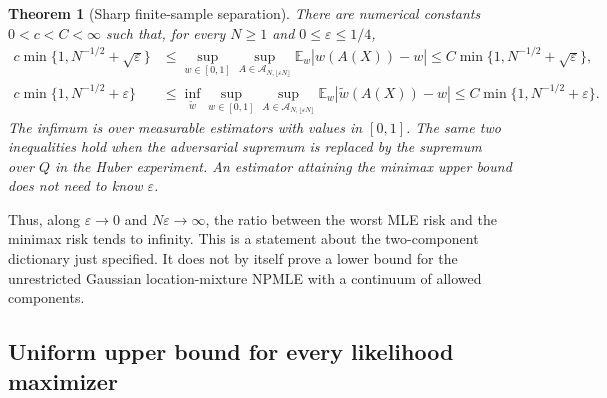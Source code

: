 \documentclass[11pt,a4paper]{article}
\newtheorem{theorem}{Theorem}[section]
\theoremstyle{definition}
\theoremstyle{remark}
\numberwithin{equation}{section}
\begin{document}
\begin{theorem}[Sharp finite-sample separation]\label{p4:eg:rates}
There are numerical constants $0<c<C<\infty$ such that, for every
$N\ge1$ and $0\le\varepsilon\le1/4$,
\begin{align}
 c\min\{1,N^{-1/2}+\sqrt\varepsilon\}
 &\le
 \sup_{w\in[0,1]}\sup_{A\in\mathcal A_{N,\lfloor\varepsilon N\rfloor}}
       \mathbb E_w|\widehat w(A(X))-w|
 \le C\min\{1,N^{-1/2}+\sqrt\varepsilon\},
 \label{p4:eg:mle-rate}\\
 c\min\{1,N^{-1/2}+\varepsilon\}
 &\le
 \inf_{\widetilde w}\sup_{w\in[0,1]}
       \sup_{A\in\mathcal A_{N,\lfloor\varepsilon N\rfloor}}
       \mathbb E_w|\widetilde w(A(X))-w|
 \le C\min\{1,N^{-1/2}+\varepsilon\}.
 \label{p4:eg:minimax-rate}
\end{align}
The infimum is over measurable estimators with values in $[0,1]$.
The same two inequalities hold when the adversarial supremum is
replaced by the supremum over $Q$ in the Huber experiment.
An estimator attaining the minimax upper bound does not need to know
$\varepsilon$.
\end{theorem}

Thus, along $\varepsilon\to0$ and $N\varepsilon\to\infty$, the ratio
between the worst MLE risk and the minimax risk tends to infinity.
This is a statement about the two-component dictionary just specified.
It does not by itself prove a lower bound for the unrestricted
Gaussian location-mixture NPMLE with a continuum of allowed components.

\subsection{Uniform upper bound for every likelihood maximizer}
\end{document}
